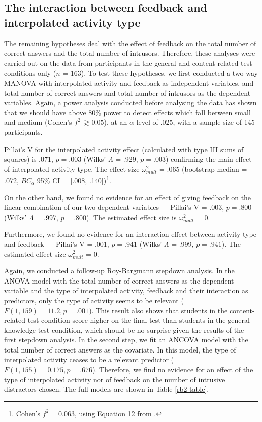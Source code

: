 \documentclass[
  11pt,
]{article}
\begin{document}
\hypertarget{the-interaction-between-feedback-and-interpolated-activity-type}{%
\subsection{The interaction between feedback and interpolated activity
type}\label{the-interaction-between-feedback-and-interpolated-activity-type}}

The remaining hypotheses deal with the effect of feedback on the total
number of correct answers and the total number of intrusors. Therefore,
these analyses were carried out on the data from participants in the
general and content related test conditions only (\(n\) = 163). To test
these hypotheses, we first conducted a two-way MANOVA with interpolated
activity and feedback as independent variables, and total number of
correct answers and total number of intrusors as the dependent
variables. Again, a power analysis conducted before analysing the data
has shown that we should have above 80\% power to detect effects which
fall between small and medium (Cohen's \(f^2\ \gtrsim 0.05\)), at an
\(\alpha\) level of .025, with a sample size of 145 participants.

Pillai's V for the interpolated activity effect (calculated with type
III sums of squares) is .071, \(p = .003\) (Wilks' \(\Lambda\) = .929,
\(p = .003\)) confirming the main effect of interpolated activity type.
The effect size \(\omega^2_{mult}\) = .065 (bootstrap median = .072,
\(BC_\alpha\) 95\% CI = {[}.008, .140{]})\footnote{
Cohen's \(f^2 = 0.063\), using Equation 12 from
\citet{steynjrEstimatingEffectSize2009}.
}.

On the other hand, we found no evidence for an effect of giving feedback
on the linear combination of our two dependent variables --- Pillai's V
= .003, \(p = .800\) (Wilks' \(\Lambda\) = .997, \(p = .800\)). The
estimated effect size is \(\omega^2_{mult}\) = 0.

Furthermore, we found no evidence for an interaction effect between
activity type and feedback --- Pillai's V = .001, \(p = .941\) (Wilks'
\(\Lambda\) = .999, \(p = .941\)). The estimated effect size
\(\omega^2_{mult}\) = 0.

Again, we conducted a follow-up Roy-Bargmann stepdown analysis. In the
ANOVA model with the total number of correct answers as the dependent
variable and the type of interpolated activity, feedback and their
interaction as predictors, only the type of activity seems to be
relevant (\(F(1, 159) = 11.2, p = .001\)). This result also shows that
students in the content-related-test condition score higher on the final
test than students in the general-knowledge-test condition, which should
be no surprise given the results of the first stepdown analysis. In the
second step, we fit an ANCOVA model with the total number of correct
answers as the covariate. In this model, the type of interpolated
activity ceases to be a relevant predictor
(\(F(1, 155) = 0.175, p = .676\)). Therefore, we find no evidence for an
effect of the type of interpolated activity nor of feedback on the
number of intrusive distractors chosen. The full models are shown in
Table \ref{rb2-table}.
\end{document}
